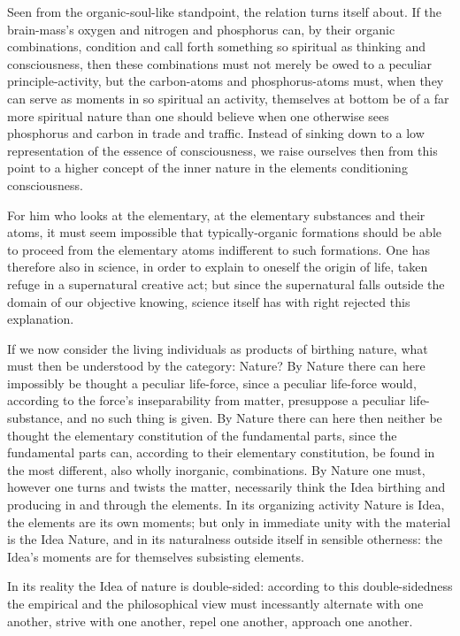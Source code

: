 \documentclass[12pt]{book}
\begin{document}
Seen from the organic-soul-like standpoint, the relation turns itself about. If the brain-mass's oxygen and
nitrogen and phosphorus can, by their organic combinations, condition and call forth something so spiritual
as thinking and consciousness, then these combinations must not merely be owed to a peculiar
principle-activity, but the carbon-atoms and phosphorus-atoms must, when they can serve as moments in so
spiritual an activity, themselves at bottom be of a far more spiritual nature than one should believe when
one otherwise sees phosphorus
and carbon in trade and traffic. Instead of sinking down to a low representation of the essence of
consciousness, we raise ourselves then from this point to a higher concept of the inner nature in the
elements conditioning consciousness.

For him who looks at the elementary, at the elementary substances and their atoms, it must seem impossible
that typically-organic formations should be able to proceed from the elementary atoms indifferent to such
formations. One has therefore also in science, in order to explain to oneself the origin of life, taken
refuge in a supernatural creative act; but since the supernatural falls outside the domain of our objective
knowing, science itself has with right rejected this explanation.

If we now consider the living individuals as products of birthing nature, what must then be understood by
the category: Nature? By Nature there can here impossibly be thought a peculiar life-force, since a peculiar
life-force would, according to the force's inseparability from matter, presuppose a peculiar life-substance,
and no such thing is given. By Nature there can here then neither be thought the elementary constitution of
the fundamental parts, since the fundamental parts can, according to their elementary constitution, be found
in the most different, also wholly inorganic, combinations. By Nature one must, however one turns and twists
the matter, necessarily think the Idea birthing and producing in and through the elements. In its organizing
activity Nature is Idea, the elements are its own moments; but only in immediate unity with the material is
the Idea Nature, and in its naturalness outside itself in sensible otherness: the Idea's moments are for
themselves subsisting elements.

In its reality the Idea of nature is double-sided: according to this double-sidedness the empirical and the
philosophical view must incessantly alternate with one another, strive with one another, repel one another,
approach one another.
\end{document}
